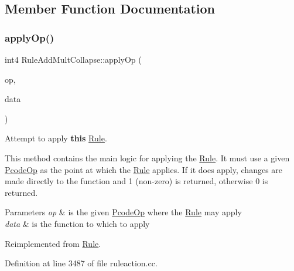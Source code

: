 \subsection{Member Function Documentation}
\mbox{\label{class_rule_add_mult_collapse_a6f9afdaabcba06d6a739e7ff9a148fc3}} 
\subsubsection{\texorpdfstring{applyOp()}{applyOp()}}
{\footnotesize\ttfamily int4 Rule\+Add\+Mult\+Collapse\+::apply\+Op (\begin{DoxyParamCaption}\item[{\mbox{\hyperlink{class_pcode_op}{Pcode\+Op}} $\ast$}]{op,  }\item[{\mbox{\hyperlink{class_funcdata}{Funcdata}} \&}]{data }\end{DoxyParamCaption})\hspace{0.3cm}{\ttfamily [virtual]}}



Attempt to apply {\bfseries{this}} \mbox{\hyperlink{class_rule}{Rule}}. 

This method contains the main logic for applying the \mbox{\hyperlink{class_rule}{Rule}}. It must use a given \mbox{\hyperlink{class_pcode_op}{Pcode\+Op}} as the point at which the \mbox{\hyperlink{class_rule}{Rule}} applies. If it does apply, changes are made directly to the function and 1 (non-\/zero) is returned, otherwise 0 is returned. 
\begin{DoxyParams}{Parameters}
{\em op} & is the given \mbox{\hyperlink{class_pcode_op}{Pcode\+Op}} where the \mbox{\hyperlink{class_rule}{Rule}} may apply \\
\hline
{\em data} & is the function to which to apply \\
\hline
\end{DoxyParams}


Reimplemented from \mbox{\hyperlink{class_rule_a4e3e61f066670175009f60fb9dc60848}{Rule}}.



Definition at line 3487 of file ruleaction.\+cc.

